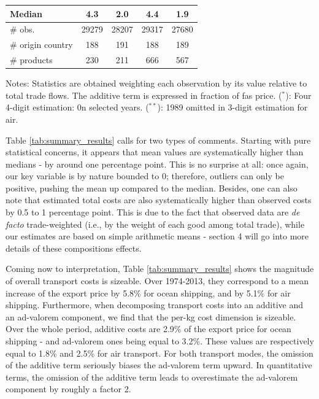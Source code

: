 \documentclass[a4paper,11pt]{article}
\begin{document}
\begin{table}[htbp]
{\begin{center}
\begin{tabular}{l|cc|cc}
        Median & 4.3 & 2.0 & 4.4& 1.9 \\ \hline
        \# obs. & 29279 & 28207 & 29317 & 27680 \\
    \# origin country & 188 & 191 & 188 & 189 \\
    \# products & 230 & 211 & 666 & 567 \\  \hline \hline
  \end{tabular}
    \end{center}}
\parbox[l]{10cm}{\tiny{Notes: Statistics are obtained weighting each observation by its value relative to total trade flows. The additive term is expressed in fraction of fas price. ($^\ast$): Four 4-digit estimation: 0n selected years. ($^{\ast \ast}$): 1989 omitted in 3-digit estimation for air.}}
\end{table}%


Table \ref{tab:summary_results} calls for two types of comments. Starting with pure statistical concerns, it appears that mean values are systematically higher than medians - by around one percentage point. This is no surprise at all: once again, our key variable is by nature bounded to 0; therefore, outliers can only be positive, pushing the mean up compared to the median. Besides, one can also note that estimated total costs are also systematically higher than observed costs by 0.5 to 1 percentage point. This is due to the fact that observed data are \emph{de facto} trade-weighted (i.e., by the weight of each good among total trade), while our estimates are based on simple arithmetic means - section 4 will go into more details of these compositions effects.

Coming now to interpretation, Table \ref{tab:summary_results} shows the magnitude of overall transport costs is sizeable. Over 1974-2013, they correspond to a mean increase of the export price by 5.8\% for ocean shipping, and by 5.1\% for air shipping. Furthermore, when decomposing transport costs into an additive and an ad-valorem component, we find that the per-kg cost dimension is sizeable. Over the whole period, additive costs are 2.9\% of the export price for ocean shipping  - and ad-valorem ones being equal to 3.2\%. These values are respectively equal to 1.8\% and 2.5\% for air transport. For both transport modes, the omission of the additive term seriously biases the ad-valorem term upward. In quantitative terms, the omission of the additive term leads to overestimate the ad-valorem component by roughly a factor 2.%
\end{document}
